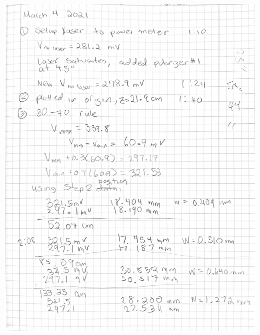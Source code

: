 \documentclass[notitlepage]{report}
\begin{document}
	\includegraphics[scale=0.75,page=2]{scanned.pdf}
\end{document}
